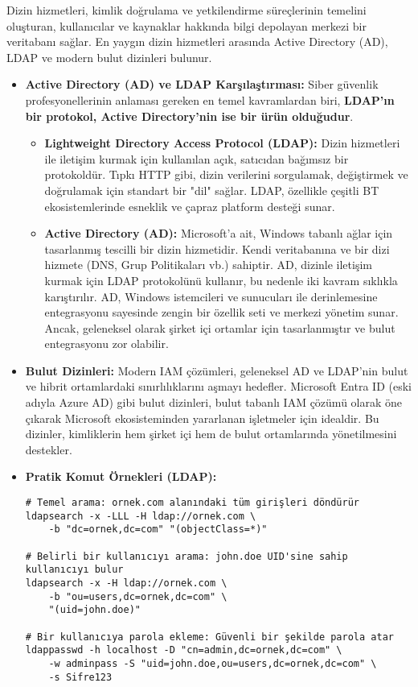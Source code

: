Dizin hizmetleri, kimlik doğrulama ve yetkilendirme süreçlerinin temelini oluşturan, kullanıcılar ve kaynaklar hakkında bilgi depolayan merkezi bir veritabanı sağlar. En yaygın dizin hizmetleri arasında Active Directory (AD), LDAP ve modern bulut dizinleri bulunur.

\begin{itemize}
    \item \textbf{Active Directory (AD) ve LDAP Karşılaştırması:} Siber güvenlik profesyonellerinin anlaması gereken en temel kavramlardan biri, \textbf{LDAP'ın bir protokol, Active Directory'nin ise bir ürün olduğudur}.
    \begin{itemize}
        \item \textbf{Lightweight Directory Access Protocol (LDAP):} Dizin hizmetleri ile iletişim kurmak için kullanılan açık, satıcıdan bağımsız bir protokoldür. Tıpkı HTTP gibi, dizin verilerini sorgulamak, değiştirmek ve doğrulamak için standart bir "dil" sağlar. LDAP, özellikle çeşitli BT ekosistemlerinde esneklik ve çapraz platform desteği sunar.
        \item \textbf{Active Directory (AD):} Microsoft'a ait, Windows tabanlı ağlar için tasarlanmış tescilli bir dizin hizmetidir. Kendi veritabanına ve bir dizi hizmete (DNS, Grup Politikaları vb.) sahiptir. AD, dizinle iletişim kurmak için LDAP protokolünü kullanır, bu nedenle iki kavram sıklıkla karıştırılır. AD, Windows istemcileri ve sunucuları ile derinlemesine entegrasyonu sayesinde zengin bir özellik seti ve merkezi yönetim sunar. Ancak, geleneksel olarak şirket içi ortamlar için tasarlanmıştır ve bulut entegrasyonu zor olabilir.
    \end{itemize}
    \item \textbf{Bulut Dizinleri:} Modern IAM çözümleri, geleneksel AD ve LDAP'nin bulut ve hibrit ortamlardaki sınırlılıklarını aşmayı hedefler. Microsoft Entra ID (eski adıyla Azure AD) gibi bulut dizinleri, bulut tabanlı IAM çözümü olarak öne çıkarak Microsoft ekosisteminden yararlanan işletmeler için idealdir. Bu dizinler, kimliklerin hem şirket içi hem de bulut ortamlarında yönetilmesini destekler.
    
    \item \textbf{Pratik Komut Örnekleri (LDAP):}
\begin{verbatim}
# Temel arama: ornek.com alanındaki tüm girişleri döndürür
ldapsearch -x -LLL -H ldap://ornek.com \
    -b "dc=ornek,dc=com" "(objectClass=*)"

# Belirli bir kullanıcıyı arama: john.doe UID'sine sahip kullanıcıyı bulur
ldapsearch -x -H ldap://ornek.com \
    -b "ou=users,dc=ornek,dc=com" \
    "(uid=john.doe)"

# Bir kullanıcıya parola ekleme: Güvenli bir şekilde parola atar
ldappasswd -h localhost -D "cn=admin,dc=ornek,dc=com" \
    -w adminpass -S "uid=john.doe,ou=users,dc=ornek,dc=com" \
    -s Sifre123
\end{verbatim}
\end{itemize}

